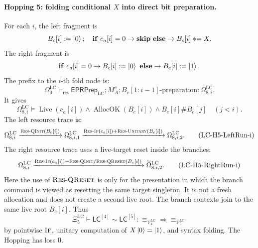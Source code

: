 \documentclass{report}
\theoremstyle{defn_style}
\newcommand{\asteq}{\mathrel{*}=}
\providecommand{\Live}{\operatorname{Live}}
\providecommand{\AllocOK}{\operatorname{AllocOK}}
\providecommand{\HopLC}[1]{\mathsf{LC}^{[#1]}}
\begin{document}
\paragraph{Hopping 5: folding conditional \(X\) into direct bit preparation.}
For each \(i\), the left fragment is
\[
B_c[i]:=\ket0;
\quad
\mathbf{if}\ c_a[i]=0\rightarrow\mathbf{skip}
\ \mathbf{else}\rightarrow B_c[i]\asteq X.
\]
The right fragment is
\[
\mathbf{if}\ c_a[i]=0\rightarrow B_c[i]:=\ket0
\ \mathbf{else}\rightarrow B_c[i]:=\ket1.
\]
The prefix to the \(i\)-th fold node is:
\[
\Omega^{\mathrm{LC}}_0
\vdash_{\mathsf{res}}
\mathsf{EPRPrep}_{\mathrm{LC}};
M_A^c;
B_c[1{:}i-1]\text{-preparation}
:
\Omega^{\mathrm{LC}}_{8,i}.
\tag{LC-H5-Prefix-i}\label{LC-H5-Prefix-i}
\]
It gives
\[
\Omega^{\mathrm{LC}}_{8,i}
\models
\Live(c_a[i])
\land
\AllocOK(B_c[i])
\land
B_c[i]\#B_c[j]\quad(j<i).
\tag{LC-H5-FoldReq-i}
\]
The left resource trace is:
\[
\Omega^{\mathrm{LC}}_{8,i}
\xrightarrow{\textsc{Res-QInit}(B_c[i])}
\Omega^{\mathrm{LC}}_{8,i,1}
\xrightarrow{\textsc{Res-If}(c_a[i])+\textsc{Res-Unitary}(B_c[i])}
\Omega^{\mathrm{LC}}_{8,i,2}.
\tag{LC-H5-LeftRun-i}
\]
The right resource trace uses a live-target reset inside the branches:
\[
\Omega^{\mathrm{LC}}_{8,i}
\xrightarrow{\textsc{Res-If}(c_a[i])+
  \textsc{Res-QInit}/\textsc{Res-QReset}(B_c[i])}
\widetilde\Omega^{\mathrm{LC}}_{8,i,2}.
\tag{LC-H5-RightRun-i}
\]
Here the use of \(\textsc{Res-QReset}\) is only for the presentation in which
the branch command is viewed as resetting the same target singleton.  It is not
a fresh allocation and does not create a second live root.  The branch contexts
join to the same live root \(B_c[i]\).  Thus
\[
\Xi^{\mathrm{LC}}_5
\vdash
\HopLC{4}\sim\HopLC{5}:
\equiv_{\mathcal V^{\mathrm{LC}}_4}
\Longrightarrow
\equiv_{\mathcal V^{\mathrm{LC}}_5}
\tag{LC-H5-Rel}
\]
by pointwise \(\textsc{If}\), unitary computation of \(X\ket0=\ket1\), and
syntax folding.  The Hopping has loss \(0\).
\end{document}
